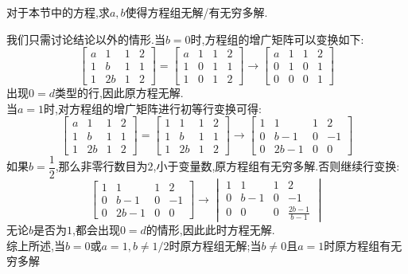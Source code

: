 \documentclass{ctexart}
\begin{document}
\begin{homework}[6]
    对于本节中的方程,求$a,b$使得方程组无解/有无穷多解.
\end{homework}
\begin{solution}
    我们只需讨论结论以外的情形.当$b=0$时,方程组的增广矩阵可以变换如下:
    \[\begin{bmatrix}
        a&1&1&2\\
        1&b&1&1\\
        1&2b&1&2
    \end{bmatrix}=\begin{bmatrix}
        a&1&1&2\\
        1&0&1&1\\
        1&0&1&2
    \end{bmatrix}\longrightarrow\begin{bmatrix}
        a&1&1&2\\
        0&1&0&1\\
        0&0&0&1
    \end{bmatrix}\]
    出现$0=d$类型的行,因此原方程无解.\\当$a=1$时,对方程组的增广矩阵进行初等行变换可得:
    \[\begin{bmatrix}
        a&1&1&2\\
        1&b&1&1\\
        1&2b&1&2
    \end{bmatrix}=\begin{bmatrix}
        1&1&1&2\\
        1&b&1&1\\
        1&2b&1&2
    \end{bmatrix}\longrightarrow\begin{bmatrix}
        1&1&1&2\\
        0&b-1&0&-1\\
        0&2b-1&0&0
    \end{bmatrix}\]
    如果$b=\dfrac12$,那么非零行数目为$2$,小于变量数,原方程组有无穷多解.否则继续行变换:
    \[\begin{bmatrix}
        1&1&1&2\\
        0&b-1&0&-1\\
        0&2b-1&0&0
    \end{bmatrix}\longrightarrow
    \begin{vmatrix}
        1&1&1&2\\
        0&b-1&0&-1\\
        0&0&0&\frac{2b-1}{b-1}
    \end{vmatrix}\]
    无论$b$是否为$1$,都会出现$0=d$的情形,因此此时方程无解.\\
    综上所述,{\color{red}当$b=0$或$a=1,b\neq1/2$}时原方程组无解;当$b\neq0$且$a=1$时原方程组有无穷多解
\end{solution}
\end{document}

